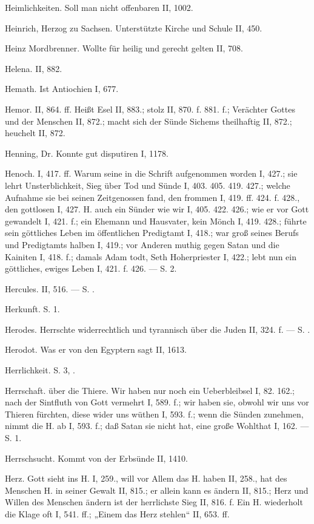 Heimlichkeiten. Soll man nicht offenbaren II, 1002.

Heinrich, Herzog zu Sachsen. Unterstützte Kirche und Schule II, 450.

Heinz Mordbrenner. Wollte für heilig und gerecht gelten II, 708.

Helena. II, 882.

Hemath. Ist Antiochien I, 677.

Hemor. II, 864. ff. Heißt Esel II, 883.; stolz II, 870. f. 881. f.; Verächter Gottes und der Menschen II, 872.; macht sich der Sünde Sichems theilhaftig II, 872.; heuchelt II, 872.

Henning, Dr. Konnte gut disputiren I, 1178.

Henoch. I, 417. ff. Warum seine  in die Schrift aufgenommen worden I, 427.; sie lehrt Unsterblichkeit, Sieg über Tod und Sünde I, 403. 405. 419. 427.; welche Aufnahme sie bei seinen Zeitgenossen fand, den frommen I, 419. ff. 424. f. 428., den gottlosen I, 427. H.  auch ein Sünder wie wir I, 405. 422. 426.; wie er vor Gott gewandelt I, 421. f.; ein Ehemann und Hausvater, kein Mönch I, 419. 428.; führte sein göttliches Leben im öffentlichen Predigtamt I, 418.; war groß seines Berufs und Predigtamts halben I, 419.; vor Anderen muthig gegen Satan und die Kainiten I, 418. f.; damals Adam todt, Seth Hoherpriester I, 422.; lebt nun ein göttliches, ewiges Leben I, 421. f. 426. — S.  2.

Hercules. II, 516. — S. .

Herkunft. S.  1.

Herodes. Herrschte widerrechtlich und tyrannisch über die Juden II, 324. f. — S. .

Herodot. Was er von den Egyptern sagt II, 1613.

Herrlichkeit. S.  3, .

Herrschaft. über die Thiere. Wir haben nur noch ein Ueberbleibsel I, 82. 162.; nach der Sintfluth von Gott vermehrt I, 589. f.; wir haben sie, obwohl wir uns vor Thieren fürchten, diese wider uns wüthen I, 593. f.; wenn die Sünden zunehmen, nimmt die H. ab I, 593. f.; daß Satan sie nicht hat, eine große Wohlthat I, 162. — S.  1.

Herrschsucht. Kommt von der Erbsünde II, 1410.

Herz. Gott sieht ins H. I, 259., will vor Allem das H. haben II, 258., hat des Menschen H. in seiner Gewalt II, 815.; er allein kann es ändern II, 815.; Herz und Willen des Menschen ändern ist der herrlichste Sieg II, 816. f. Ein  H. wiederholt die Klage oft I, 541. ff.; „Einem das Herz stehlen“ II, 653. ff.

